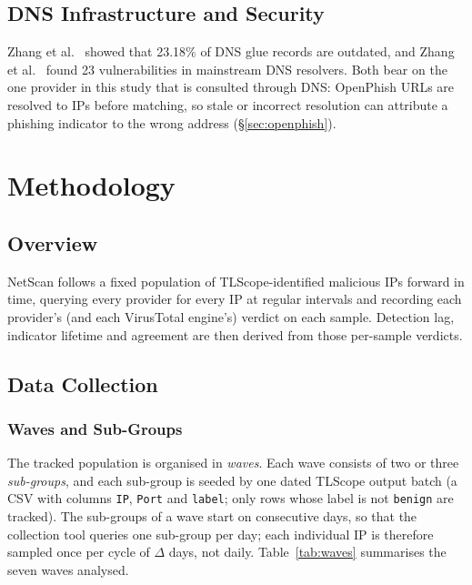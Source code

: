 \section{DNS Infrastructure and Security}

Zhang et al.\ \cite{zhang2024staleglue} showed that 23.18\% of DNS glue records are outdated, and
Zhang et al.\ \cite{zhang2024resolverfuzz} found 23 vulnerabilities in mainstream DNS resolvers. Both
bear on the one provider in this study that is consulted through DNS: OpenPhish URLs are resolved to
IPs before matching, so stale or incorrect resolution can attribute a phishing indicator to the
wrong address (\S\ref{sec:openphish}).

\chapter{Methodology}
\label{ch:methodology}

\section{Overview}

NetScan follows a fixed population of TLScope-identified malicious IPs forward in time, querying
every provider for every IP at regular intervals and recording each provider's (and each VirusTotal
engine's) verdict on each sample. Detection lag, indicator lifetime and agreement are then derived
from those per-sample verdicts.

\section{Data Collection}

\subsection{Waves and Sub-Groups}
\label{sec:waves}

The tracked population is organised in \emph{waves}. Each wave consists of two or three
\emph{sub-groups}, and each sub-group is seeded by one dated TLScope output batch (a CSV with
columns \texttt{IP}, \texttt{Port} and \texttt{label}; only rows whose label is not
\texttt{benign} are tracked). The sub-groups of a wave start on consecutive days, so that the
collection tool queries one sub-group per day; each individual IP is therefore sampled once per
cycle of $\Delta$ days, not daily. Table~\ref{tab:waves} summarises the seven waves analysed.

